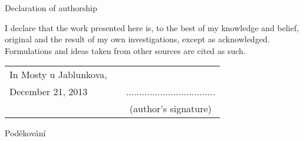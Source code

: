 \newcommand{\odsaditodzhora}{\hskip1pt\vfill}

\odsaditodzhora
\noindent Declaration of authorship

I declare that the work presented here is, to the best of my knowledge and
belief, original and the result of my own investigations, except as acknowledged.
Formulations and ideas taken from other sources are cited as such.

 \begin{flushleft}
\begin{tabular}{l m{6cm} c}
In Mosty u Jablunkova, && \\
December 21, 2013
& 
&
..................................
\\
&&
(author’s signature)
\end{tabular}

\end{flushleft}
\newpage


\odsaditodzhora
\noindent Poděkování


\newpage
